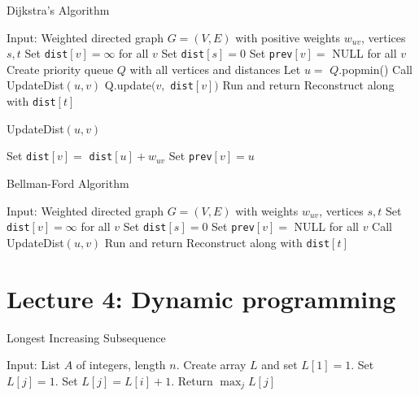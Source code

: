 \documentclass[10pt]{article}
\begin{document}
\begin{algorithm}
\caption{Dijkstra's Algorithm}
\begin{algorithmic}[1]
  \STATE Input: Weighted directed graph $G = (V,E)$ with positive weights $w_{uv}$, vertices $s,t$
  \STATE Set \texttt{dist}$[v] = \infty$ for all $v$
  \STATE Set \texttt{dist}$[s] = 0$
  \STATE Set \texttt{prev}$[v] = $ NULL for all $v$
  \STATE Create priority queue $Q$ with all vertices and distances
    \STATE Let $u = $ $Q$.popmin()
      \STATE Call UpdateDist$(u, v)$
      \STATE Q.update$(v, $ \texttt{dist}$[v])$  
    \ENDFOR
  \ENDWHILE
  \STATE Run and return Reconstruct along with \texttt{dist}$[t]$
\end{algorithmic}
\end{algorithm}

\begin{algorithm}
\caption{UpdateDist$(u,v)$}
\begin{algorithmic}[1]
    \STATE Set \texttt{dist}$[v] = $ \texttt{dist}$[u] + w_{uv}$
    \STATE Set \texttt{prev}$[v] = u$
  \ENDIF
\end{algorithmic}
\end{algorithm}


\begin{algorithm}
\caption{Bellman-Ford Algorithm}
\begin{algorithmic}[1]
  \STATE Input: Weighted directed graph $G = (V,E)$ with weights $w_{uv}$, vertices $s,t$
  \STATE Set \texttt{dist}$[v] = \infty$ for all $v$
  \STATE Set \texttt{dist}$[s] = 0$
  \STATE Set \texttt{prev}$[v] = $ NULL for all $v$
      \STATE Call UpdateDist$(u,v)$
    \ENDFOR
  \ENDFOR
  \STATE Run and return Reconstruct along with \texttt{dist}$[t]$
\end{algorithmic}
\end{algorithm}


\break
\section{Lecture 4: Dynamic programming}

\begin{algorithm}
\caption{Longest Increasing Subsequence}
\label{alg:lis}
\begin{algorithmic}[1]
  \STATE Input: List $A$ of integers, length $n$.
  \STATE Create array $L$ and set $L[1] = 1$.
    \STATE Set $L[j] = 1$.
        \STATE Set $L[j] = L[i] + 1$.
      \ENDIF
    \ENDFOR
  \ENDFOR
  \STATE Return $\max_j L[j]$
\end{algorithmic}
\end{algorithm}
\end{document}

